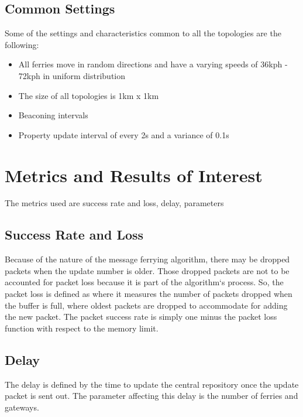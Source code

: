 \subsection{Common Settings}
\label{sec:commonsettings}
Some of the settings and characteristics common to all the topologies are the following:
	\begin{itemize}
	\item All ferries move in random directions and have a varying speeds of 36kph - 72kph in uniform distribution 
	\item The size of all topologies is 1km x 1km
	\item Beaconing intervals  %
	\item Property update interval of every 2s and a variance of 0.1s
	\end{itemize}


\section{Metrics and Results of Interest }
\label{sec:metrics}

The metrics used are success rate and loss, delay, parameters  %

\subsection{Success Rate and Loss}
Because of the nature of the message ferrying algorithm, there may be dropped packets when the update number is older.
Those dropped packets are not to be accounted for packet loss because it is part of the algorithm`s process.
So, the packet loss is defined as where it measures the number of packets dropped when the buffer is full, where oldest packets are dropped to accommodate for adding the new packet.
The packet success rate is simply one minus the packet loss function with respect to the memory limit.


\subsection{Delay}
The delay is defined by the time to update the central repository once the update packet is sent out.  
The parameter affecting this delay is the number of ferries and gateways.

